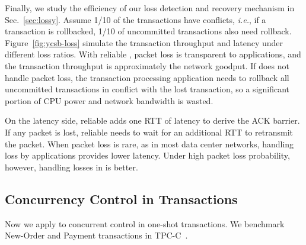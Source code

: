 
Finally, we study the efficiency of our loss detection and recovery mechanism in Sec.~\ref{sec:lossy}.
Assume 1/10 of the transactions have conflicts, \textit{i.e.}, if a transaction is rollbacked, 1/10 of uncommitted transactions also need rollback.
Figure~\ref{fig:ycsb-loss} simulate the transaction throughput and latency under different loss ratios. With reliable \sys, packet loss is transparent to applications, and the transaction throughput is approximately the network goodput. If \sys does not handle packet loss, the transaction processing application needs to rollback all uncommitted transactions in conflict with the lost transaction, so a significant portion of CPU power and network bandwidth is wasted.

On the latency side, reliable \sys adds one RTT of latency to derive the ACK barrier. If any packet is lost, reliable \sys needs to wait for an additional RTT to retransmit the packet. When packet loss is rare, as in most data center networks, handling loss by applications provides lower latency. Under high packet loss probability, however, handling losses in \sys is better.

\subsection{Concurrency Control in Transactions}
\label{subsec:eval-transactions}

Now we apply \sys to concurrent control in one-shot transactions. We benchmark New-Order and Payment transactions in TPC-C~\cite{tpcc}.


